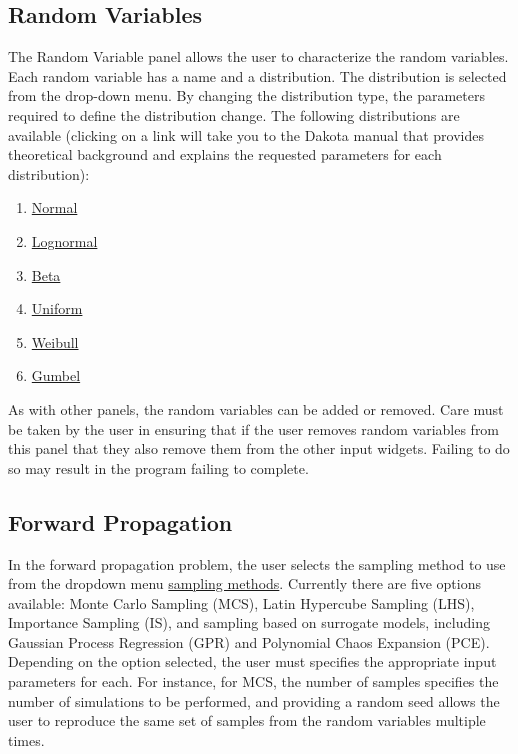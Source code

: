 \subsection{Random Variables}
The Random Variable panel allows the user to characterize the random
variables. Each random variable has a name and a distribution. The
distribution is selected from the drop-down menu. By changing the
distribution type, the parameters required to define the distribution
change. The following distributions are available (clicking on a link will take you to the Dakota manual that provides theoretical background and explains the requested parameters for each distribution):
\begin{enumerate}
\item \href{https://dakota.sandia.gov//sites/default/files/docs/6.9/html-ref/variables-normal_uncertain.html}{Normal}
\item \href{https://dakota.sandia.gov//sites/default/files/docs/6.9/html-ref/variables-lognormal_uncertain.html}{Lognormal}
\item \href{https://dakota.sandia.gov//sites/default/files/docs/6.9/html-ref/variables-beta_uncertain.html}{Beta}
\item \href{https://dakota.sandia.gov//sites/default/files/docs/6.9/html-ref/variables-uniform_uncertain.html}{Uniform}
\item \href{https://dakota.sandia.gov//sites/default/files/docs/6.9/html-ref/variables-weibull_uncertain.html}{Weibull}
\item \href{https://dakota.sandia.gov//sites/default/files/docs/6.9/html-ref/variables-gumbel_uncertain.html}{Gumbel}
\end{enumerate} 

As with other panels, the random variables can be added or
removed. Care must be taken by the user in ensuring that if the user
removes random variables from this panel that they also remove them
from the other input widgets. Failing to do so may result in the
program failing to complete.



\subsection{Forward Propagation}
In the forward propagation problem, the user selects the sampling 
method to use from the dropdown menu \href{https://dakota.sandia.gov//sites/default/files/docs/6.9/html-ref/method-sampling.html}{sampling methods}. Currently there are five options available: 
Monte Carlo Sampling (MCS),  Latin Hypercube Sampling (LHS), Importance Sampling (IS), and sampling based on surrogate models, including Gaussian Process Regression (GPR) and Polynomial Chaos Expansion (PCE). Depending on the option selected, the user must specifies the appropriate input parameters for each. For instance, for MCS, the number of samples specifies the number of simulations to be performed, and providing a random seed allows the user to reproduce the same set of samples from the random variables multiple times.


